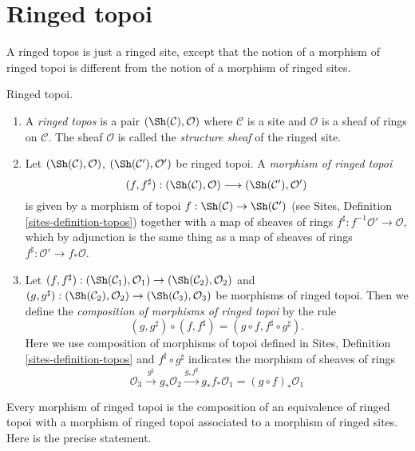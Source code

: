 \section{Ringed topoi}
\label{section-ringed-topoi}

\noindent
A ringed topos is just a ringed site, except that the notion of
a morphism of ringed topoi is different from the notion of a morphism
of ringed sites.

\begin{definition}
\label{definition-ringed-topos}
Ringed topoi.
\begin{enumerate}
\item A {\it ringed topos} is a pair
$(\Sh(\mathcal{C}), \mathcal{O})$
where $\mathcal{C}$ is a site and $\mathcal{O}$ is a sheaf of rings
on $\mathcal{C}$. The sheaf $\mathcal{O}$ is called the
{\it structure sheaf} of the ringed site.
\item Let $(\Sh(\mathcal{C}), \mathcal{O})$,
$(\Sh(\mathcal{C}'), \mathcal{O}')$ be ringed topoi.
A {\it morphism of ringed topoi}
$$
(f, f^\sharp) :
(\Sh(\mathcal{C}), \mathcal{O})
\longrightarrow
(\Sh(\mathcal{C}'), \mathcal{O}')
$$
is given by a morphism of topoi $f : \Sh(\mathcal{C}) \to \Sh(\mathcal{C}')$
(see Sites, Definition \ref{sites-definition-topos})
together with a map of sheaves of rings
$f^\sharp : f^{-1}\mathcal{O}' \to \mathcal{O}$, which by adjunction
is the same thing as a map of sheaves of rings
$f^\sharp : \mathcal{O}' \to f_*\mathcal{O}$.
\item Let
$(f, f^\sharp) :
(\Sh(\mathcal{C}_1), \mathcal{O}_1)
\to (\Sh(\mathcal{C}_2), \mathcal{O}_2)$ and
$(g, g^\sharp) :
(\Sh(\mathcal{C}_2), \mathcal{O}_2) \to
(\Sh(\mathcal{C}_3), \mathcal{O}_3)$
be morphisms of ringed topoi. Then we define
the {\it composition of morphisms of ringed topoi}
by the rule
$$
(g, g^\sharp) \circ (f, f^\sharp) = (g \circ f, f^\sharp \circ g^\sharp).
$$
Here we use composition of morphisms of topoi defined in
Sites, Definition \ref{sites-definition-topos}
and $f^\sharp \circ g^\sharp$ indicates the morphism of sheaves of
rings
$$
\mathcal{O}_3 \xrightarrow{g^\sharp} g_*\mathcal{O}_2
\xrightarrow{g_*f^\sharp} g_*f_*\mathcal{O}_1 = (g \circ f)_*\mathcal{O}_1
$$
\end{enumerate}
\end{definition}

\noindent
Every morphism of ringed topoi is the composition of an equivalence
of ringed topoi with a morphism of ringed topoi associated to a morphism
of ringed sites. Here is the precise statement.

